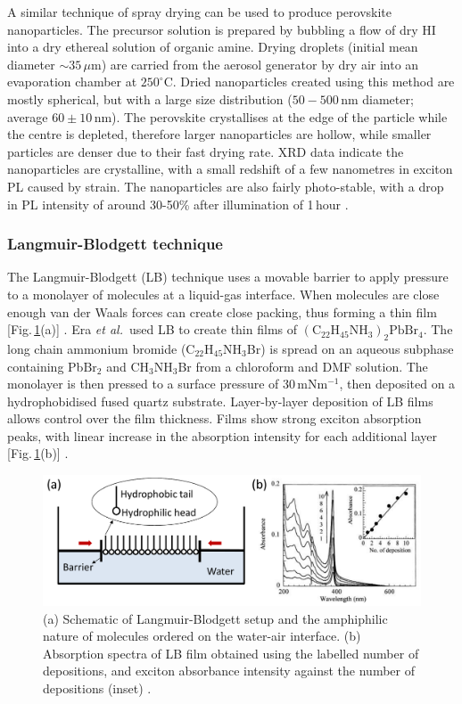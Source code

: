 A similar technique of spray drying can be used to produce perovskite nanoparticles. The precursor solution is prepared by bubbling a flow of dry HI into a dry ethereal solution of organic amine. Drying droplets (initial mean diameter $\sim 35\,\mu$m) are carried from the aerosol generator by dry air into an evaporation chamber at $250^{\circ}$C. Dried nanoparticles created using this method are mostly spherical, but with a large size distribution ($50-500$\,nm diameter; average $60\pm10$\,nm). The perovskite crystallises at the edge of the particle while the centre is depleted, therefore larger nanoparticles are hollow, while smaller particles are denser due to their fast drying rate. XRD data indicate the nanoparticles are crystalline, with a small redshift of a few nanometres in exciton PL caused by strain. The nanoparticles are also fairly photo-stable, with a drop in PL intensity of around 30-50\% after illumination of 1\,hour \cite{Audebert2009a}.

\subsubsection {Langmuir-Blodgett technique}
The Langmuir-Blodgett (LB) technique uses a movable barrier to apply pressure to a monolayer of molecules at a liquid-gas interface. When molecules are close enough van der Waals forces can create close packing, thus forming a thin film [Fig.\,\ref{2Fig6}(a)] \cite{Mitzi2001b}. Era \textit{et al.}\ used LB to create thin films of $(\textrm{C}_{22}\textrm{H}_{45}\textrm{NH}_3)_2\textrm{PbBr}_4$. The long chain ammonium bromide ($\textrm{C}_{22}\textrm{H}_{45}\textrm{NH}_3$Br) is spread on an aqueous subphase containing Pb$\textrm{Br}_2$ and $\textrm{CH}_3\textrm{NH}_3$Br from a chloroform and DMF solution. The monolayer is then pressed to a surface pressure of 30\,mN$\textrm{m}^{-1}$, then deposited on a hydrophobidised fused quartz substrate. Layer-by-layer deposition of LB films allows control over the film thickness. Films show strong exciton absorption peaks, with linear increase in the absorption intensity for each additional layer [Fig.\,\ref{2Fig6}(b)] \cite{Era2000}.
\begin{figure} [h!]
\centering
\includegraphics[width=\textwidth]{Fig6}
\caption{(a) Schematic of Langmuir-Blodgett setup and the amphiphilic nature of molecules ordered on the water-air interface. (b) Absorption spectra of LB film obtained using the labelled number of depositions, and exciton absorbance intensity against the number of depositions (inset) \cite{Era2000}.}
\label{2Fig6}
\end{figure}


